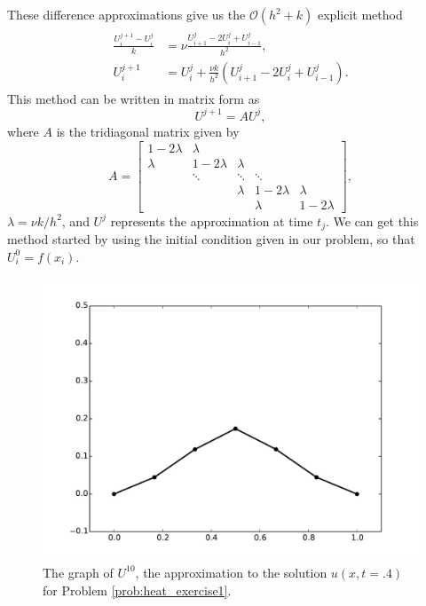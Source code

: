 These difference approximations give us the $\mathcal{O}(h^2 + k)$ explicit method
\begin{align}
	\begin{split}
	\frac{U_{i}^{j+1} - U_{i}^{j}}{k} &= \nu \frac{U_{i+1}^{j}- 2U_{i}^{j} + U_{i-1}^{j} }{h^2} ,\\
	U_{i}^{j+1} &= U_{i}^{j} + \frac{\nu k}{h^2} (U_{i+1}^{j}- 2U_{i}^{j} + U_{i-1}^{j} ).
	\end{split}\label{eqn:firstorder_explicit}
\end{align}
This method can be written in matrix form as
\[U^{j+1} = A U^j,\]
where $A$ is the tridiagonal matrix given by
\[A = \left[\begin{array}{cccccc}1-2\lambda & \lambda & & & \\ \lambda & 1-2\lambda & \lambda & & \\ & \ddots & \ddots & \ddots & \\ & & \lambda & 1-2\lambda & \lambda \\  &  &  & \lambda & 1-2\lambda\end{array}\right],\]
$\lambda = \nu k/h^2$, and $U^j$ represents the approximation at time $t_j$.
We can get this method started by using the initial condition given in our problem, so that $U_{i}^{0} = f(x_i)$.

\begin{figure}
\centering
\includegraphics[width=\textwidth]{heatexercise1b.pdf}
\caption{The graph of $U^{10}$, the approximation to the solution $u(x,t=.4)$ for Problem \ref{prob:heat_exercise1}.}
\label{fig:heatexercise1b}
\end{figure}

